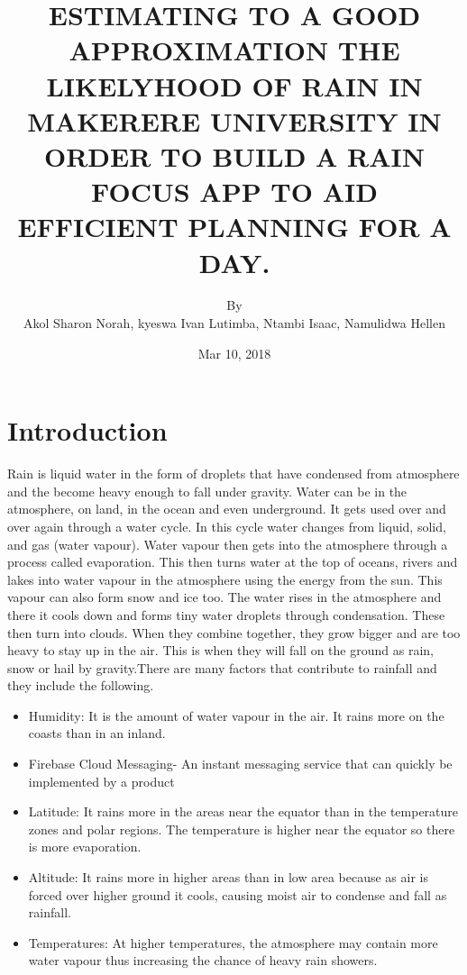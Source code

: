 \documentclass{article}
\title{ESTIMATING TO A GOOD APPROXIMATION THE LIKELYHOOD OF RAIN IN MAKERERE UNIVERSITY IN ORDER TO BUILD A RAIN FOCUS APP TO AID EFFICIENT PLANNING FOR A DAY.
}
\author{By\\Akol Sharon Norah, kyeswa Ivan Lutimba, Ntambi Isaac, Namulidwa Hellen}
\date{Mar 10, 2018}
\begin{document}
\maketitle

\newpage

\section{Introduction}
Rain is liquid water in the form of droplets that have condensed from atmosphere and the become heavy enough to fall under gravity.
Water can be in the atmosphere, on land, in the ocean and even underground. It gets used over and over again through a water cycle. In this cycle water changes from liquid, solid, and gas (water vapour). Water vapour then gets into the atmosphere through a process called evaporation. This then turns water at the top of oceans, rivers and lakes into water vapour in the atmosphere using the energy from the sun. This vapour can also form snow and ice too. The water rises in the atmosphere and there it cools down and forms tiny water droplets through condensation. These then turn into clouds. When they combine together, they grow bigger and are too heavy to stay up in the air. This is when they will fall on the ground as rain, snow or hail by gravity.There are many factors that contribute to rainfall and they include the following.


\begin{itemize}
    \item Humidity: It is the amount of water vapour in the air. It rains more on the coasts than in an inland.

    \item Firebase Cloud Messaging- An instant messaging service that can quickly be implemented by a product
    \item Latitude:  It rains more in the areas near the equator than in the temperature zones and polar regions. The temperature is higher near the equator so there is more evaporation.
    \item Altitude: It rains more in higher areas than in low area because as air is forced over higher ground it cools, causing moist air to condense and fall as rainfall.
    \item Temperatures: At higher temperatures, the atmosphere may contain more water vapour thus increasing the chance of heavy rain showers.

    \end{itemize}
\end{document}
